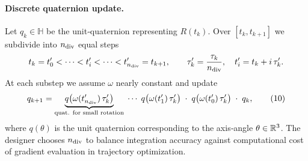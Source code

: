 \documentclass[main.tex]{subfiles}
\begin{document}
\paragraph{Discrete quaternion update.}
Let $q_k\in\mathbb{H}$ be the unit‐quaternion representing $R(t_k)$.
Over $[t_k,t_{k+1}]$ we subdivide into $n_{\rm div}$ equal steps
\[
t_k = t'_0 < \cdots < t'_i < \cdots < t'_{n_{\rm div}} = t_{k+1},\qquad
\tau_k' = \frac{\tau_k}{n_{\rm div}},\quad
t'_i = t_k + i\,\tau_k'.
\]
At each substep we assume $\omega$ nearly constant and update
\[
q_{k+1}
= \underbrace{q\bigl(\omega(t'_{n_{\rm div}})\,\tau_k'\bigr)}
_{\text{quat. for small rotation}}
\;\cdots\;
q\bigl(\omega(t'_1)\,\tau_k'\bigr)\;\cdot\;
q\bigl(\omega(t'_0)\,\tau_k'\bigr)\;\cdot\;q_k,
\tag{10}
\]
where $q(\theta)$ is the unit quaternion corresponding to the axis‐angle $\theta\in\Bbb R^3$.  The designer chooses $n_{\rm div}$ to balance integration accuracy against computational cost of gradient evaluation in trajectory optimization.
\end{document}
